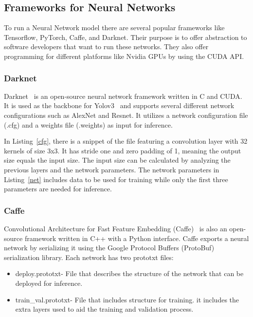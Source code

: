 
 \subsection{Frameworks for Neural Networks}
 \label{section:Darknet}

To run a Neural Network model there are several popular frameworks like
Tensorflow, PyTorch, Caffe, and Darknet.  Their purpose is to offer abstraction
to software developers that want to run these networks. They also offer
programming for different platforms like Nvidia GPUs by using the CUDA API.

\subsubsection{Darknet}

Darknet~\cite{Darknet} is an open-source neural network framework written in C
and CUDA. It is used as the backbone for Yolov3~\cite{yolov3} and supports
several different network configurations such as AlexNet and Resnet.  It
utilizes a network configuration file (.cfg) and a weights file (.weights) as
input for inference.



In Listing~\ref{cfg}, there is a snippet of the file featuring a convolution
layer with 32 kernels of size 3x3. It has stride one and zero padding of 1,
meaning the output size equals the input size. The input size can be
calculated by analyzing the previous layers and the network parameters. The
network parameters in Listing~\ref{net} includes data to be used for training while only
the first three parameters are needed for inference.




\subsubsection{Caffe}

Convolutional Architecture for Fast Feature Embedding (Caffe)~\cite{caffe} is
also an open-source framework written in C++ with a Python interface.  Caffe
exports a neural network by serializing it using the Google Protocol Buffers
(ProtoBuf) serialization library. Each network has two prototxt files:
\begin{itemize}
    \item deploy.prototxt- File that describes the structure of the network that
      can be deployed for inference.
    \item train\_val.prototxt- File that includes structure for training.  it
      includes the extra layers used to aid the training and validation process.
\end{itemize}

